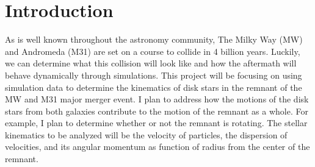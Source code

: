 \documentclass[twocolumn]{aastex63}
\begin{document}
\author{Madison Walder}







\section{Introduction} \label{sec:intro}

As is well known throughout the astronomy community, The Milky Way (MW) and Andromeda (M31) are set on a course to collide in 4 billion years.  Luckily, we can determine what this collision will look like and how the aftermath will behave dynamically through simulations.  This project will be focusing on using simulation data to determine the kinematics of disk stars in the remnant of the MW and M31 major merger event.  I plan to address how the motions of the disk stars from both galaxies contribute to the motion of the remnant as a whole. For example, I plan to determine whether or not the remnant is rotating.  The stellar kinematics to be analyzed will be the velocity of particles, the dispersion of velocities, and its angular momentum as function of radius from the center of the remnant.  
\end{document}
